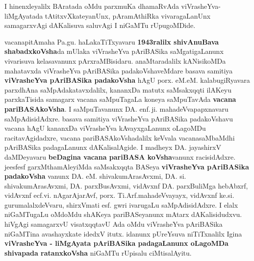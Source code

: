 \medskip

I hinenxleyalilx BAratada oMdu parxmuKa dhamaRvAda viVrasheYva-liMgAyatada tAtitxvXkateyanUnx, pAramAthiRka vivara\-gaLanUnx samagarxvAgi dAKalisuva saluvAgi I niGaMTu rUpugoMDide. 

\medskip

vacanapitAmaha Pa.gu. haLakaTiTxyavaru \textbf{1943ralilx shivAnuBava shabadxkoVsha}da mUlaka viVrasheYva pAriBASika saMgati\-gaLanunx vivarisuva kelasavanunx pArxraMBisidaru. anaMtaradalilx kANisikoMDa mahatavxda viVrasheYva pAriBASika padakoVsha\-veMdare basava samitiya \textbf{viVrasheYva pAriBASika padakoVsha} hAgU porx. eM.eM. kalabugiRyavara parxdhAna saMpAdakatavx\-dalilx, kananxDa matutx saMsakxqqti ilAKeyu parxkaTisida samagarx vacana saMpuTagaLa koneya saMpuTavAda \textbf{vacana pariBASA\-koVsha}. I saMpuTa\-vanunx DA. enf.\,ji. mahadeVvapapxnavaru saMpAdisidAdxre. basava samitiya viVrasheYva pAriBASika padakoVshavu vacana hAgU kananxDa \hbox{viVrasheYva} kAvayxgaLanunx oLagoMDu racitavAgidadxre, vacana pariBASAkoVshadalilx keVvala vacanasaMbaMdhi pAri\-BASika padagaLanunx dAKalisalAgide. I madheyx DA. jayashirxV daMDeyavaru \textbf{beDagina vacana pariBASA koVsha}vanunx racisidAdxre. jeesfesf garxMthamAleyiMda saMsakxqqta BASeya \textbf{viVrasheYva pAriBASika padakoVsha} vanunx DA. eM. shivakumArasAvxmi, DA. si. shiva\-kumArasAvxmi, DA. parxBusAvxmi, vidAvxnf DA. parxBuliMga hebAbxrf, vidAvxnf ecf.vi. nAgarAjarAvf, porx. Ti.Arf.\break mahadeVvayayx, vidAvxnf ke.si. gurumalalxdeVvaru, shirxVmati esf. gwri ivarugaLu saMpAdi\-sidAdxre. I elalx niGaMTugaLu oMdoMdu shAKeya pariBASeyanunx mAtarx dAKalisidudxvu. hiVgAgi samagarxvU visatxqqtavU Ada oMdu viVrasheYva pAriBASika niGaMTina avashayxkate idedxV itutx. idanunx pUreYsuva niTiTxnalilx Igina \textbf{viVrasheYva - liMgAyata pAriBASika padagaLanunx oLagoMDa shivapada ratanxkoVsha} niGaMTu rUpisalu ciMtisalAyitu.

\medskip

